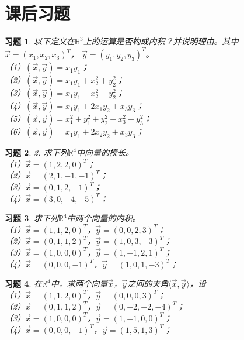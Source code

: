 \documentclass[a4paper]{book}
\newtheorem{ex}{习题}[chapter]
\begin{document}

\section{课后习题}

\begin{ex}\label{6.1}
以下定义在$\mathbb{R}^3$上的运算是否构成内积？并说明理由。其中$\vec{x}=(x_1,x_2,x_3 )^T$，
 $\vec{y}=(y_1,y_2,y_3 )^T$。\\
（1）$(\vec{x},\vec{y})=x_1y_1$；\\
（2）$(\vec{x},\vec{y})=x_1y_1+x_2^2+y_2^2$；\\
（3）$(\vec{x},\vec{y})=x_1y_1-x_2^2-y_2^2$；\\
（4）$(\vec{x},\vec{y})=x_1y_1+2x_1y_2+x_3y_3$；\\
（5）$(\vec{x},\vec{y})=x_1^2+y_1^2+y_2^2+x_3^2+y_3^2$；\\
（6）$(\vec{x},\vec{y})=x_1y_1+2x_2y_2+x_3y_3$；
\end{ex}

\begin{ex}\label{6.2}
2. 求下列$\mathbb{R}^4$中向量的模长。\\
（1）$\vec{x}=(1,2,2,0)^T$；\\
（2）$\vec{x}=(2,1,-1,-1)^T$；\\
（3）$\vec{x}=(0,1,2,-1)^T$；\\
（4）$\vec{x}=(3,0,-4,-5)^T$；
\end{ex}

\begin{ex}\label{6.3}
求下列$\mathbb{R}^4$中两个向量的内积。\\
（1）$\vec{x}=(1,1,2,0)^T$，$\vec{y}=(0,0,2,3)^T$；\\
（2）$\vec{x}=(0,1,1,2)^T$，$\vec{y}=(1,0,3,-3)^T$；\\
（3）$\vec{x}=(1,0,0,0)^T$，$\vec{y}=(1,-1,2,1)^T$；\\
（4）$\vec{x}=(0,0,0,-1)^T$，$\vec{y}=(1,0,1,-3)^T$；
\end{ex}

\begin{ex}\label{6.4}
在$\mathbb{R}^4$中，求两个向量$\vec{x}$，$\vec{y}$之间的夹角$\langle\vec{x},\vec{y}\rangle$，设\\
（1）$\vec{x}=(1,1,2,0)^T$，$\vec{y}=(0,0,0,3)^T$；\\
（2）$\vec{x}=(0,1,1,2)^T$，$\vec{y}=(0,-2,-2,-4)^T$；\\
（3）$\vec{x}=(1,0,0,0)^T$，$\vec{y}=(1,-1,0,0)^T$；\\
（4）$\vec{x}=(0,0,0,-1)^T$，$\vec{y}=(1,5,1,3)^T$；
\end{ex}
\end{document}
